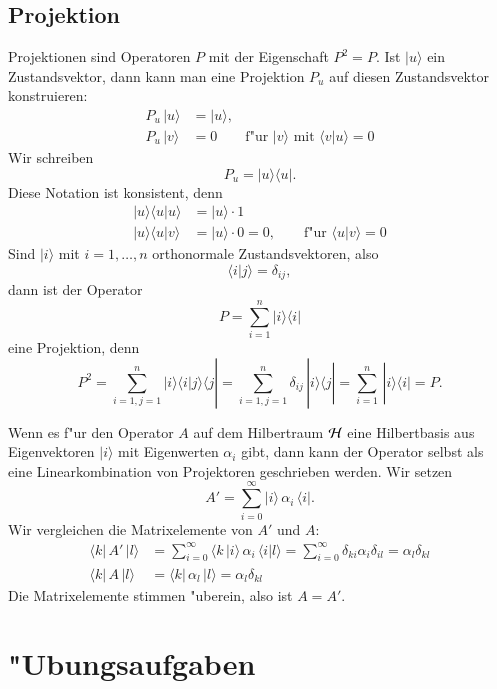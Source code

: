\subsection{Projektion}
Projektionen sind Operatoren $P$ mit der Eigenschaft $P^2=P$.
Ist $|u\rangle$ ein Zustandsvektor, dann kann man eine Projektion $P_u$
auf diesen Zustandsvektor konstruieren:
\begin{align*}
P_u\,|u\rangle&=|u\rangle,\\
P_u\,|v\rangle&=0\qquad \text{f"ur $|v\rangle$ mit $\langle v|u\rangle=0$}
\end{align*}
Wir schreiben 
\[
P_u=
|u\rangle\langle u|
.
\]
Diese Notation ist konsistent, denn 
\begin{align*}
|u\rangle\langle u|u\rangle&=|u\rangle\cdot 1\\
|u\rangle\langle u|v\rangle&=|u\rangle\cdot 0=0,\qquad
\text{f"ur $\langle u|v\rangle = 0$}
\end{align*}
Sind $|i\rangle$ mit $i=1,\dots, n$ orthonormale Zustandsvektoren, also
\[
\langle i|j\rangle =\delta_{ij},
\]
dann ist der Operator
\[
P=\sum_{i=1}^n |i\rangle \langle i|
\]
eine Projektion, denn
\[
P^2=
\sum_{i=1, j = 1}^n
|i\rangle \langle i|j\rangle \langle j|
=
\sum_{i=1, j = 1}^n
\delta_{ij} \,|i\rangle\langle j|=\sum_{i=1}^n\,|i\rangle\langle i|=P.
\]

Wenn es f"ur den Operator $A$ auf dem Hilbertraum $\cal H$ eine
Hilbertbasis aus Eigenvektoren $|i\rangle$ mit Eigenwerten $\alpha_i$ gibt,
dann kann der Operator selbst
als eine Linearkombination von Projektoren geschrieben werden. Wir setzen
\[
A'=\sum_{i=0}^\infty |i\rangle \,\alpha_i\, \langle i|.
\]
Wir vergleichen die Matrixelemente von $A'$ und $A$:
\begin{align*}
\langle k|\, A' \,|l\rangle
&=
\sum_{i=0}^\infty \langle k\,|i\rangle\, \alpha_i \,\langle i|l\rangle
=\sum_{i=0}^\infty \delta_{ki}\alpha_i\delta_{il}
=\alpha_l\delta_{kl}
\\
\langle k|\,A\,|l\rangle
&=
\langle k|\,\alpha_l\,|l\rangle=\alpha_l\delta_{kl}
\end{align*}
Die Matrixelemente stimmen "uberein, also ist $A=A'$.

\section{"Ubungsaufgaben}
\begin{uebungsaufgaben}
\item

\item

\end{uebungsaufgaben}
